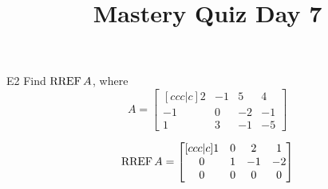 \documentclass{sbgLAquiz}
\title{Mastery Quiz Day 7 }
\begin{document}
\begin{problem}{E2}
Find \(\operatorname{RREF} A\), where
\[
  A =
  \begin{bmatrix}[ccc|c]
    2 & -1 & 5 & 4 \\
    -1 & 0 & -2 & -1 \\
    1 & 3 & -1 & -5
  \end{bmatrix}
\]
\end{problem}
\begin{solution}
\[
  \operatorname{RREF} A =
  \begin{bmatrix}[ccc|c]
    1 & 0 & 2 & 1 \\
    0 & 1 & -1 & -2 \\
    0 & 0 & 0 & 0
  \end{bmatrix}
\]
\end{solution}
\end{document}
